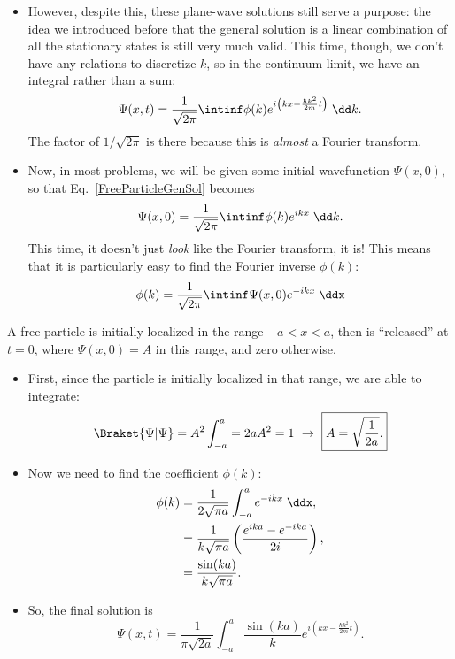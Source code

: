 \begin{itemize}
    \item However, despite this, these plane-wave solutions still serve a purpose: the idea we introduced before that the general solution is a linear combination of all the stationary states is still very much valid. This time, though, we don't have any relations to discretize $k$, so in the continuum limit, we have an integral rather than a sum:
        \begin{equation}
            \Psi(x,t) = \frac{1}{\sqrt{2\pi}} \intinf \phi(k) e^{i\left(kx - \frac{\hbar k^2}{2m}t \right)}\;\dd k.\label{FreeParticleGenSol}
        \end{equation}
        The factor of $1/\sqrt{2\pi}$ is there because this is \textit{almost} a Fourier transform.
    \item Now, in most problems, we will be given some initial wavefunction $\Psi(x,0)$, so that Eq.~\eqref{FreeParticleGenSol} becomes
        \begin{equation}
            \Psi(x,0) = \frac{1}{\sqrt{2\pi}} \intinf \phi(k) e^{ikx}\;\dd k.
        \end{equation}
        This time, it doesn't just \textit{look} like the Fourier transform, it is! This means that it is particularly easy to find the Fourier inverse $\phi(k)$:
        \begin{equation}
            \phi(k) = \frac{1}{\sqrt{2\pi}} \intinf \Psi(x,0) e^{-ikx} \;\ddx
        \end{equation}
\end{itemize}


\begin{example}
    A free particle is initially localized in the range $-a < x < a$, then is ``released'' at $t=0$, where $\Psi(x,0) = A$ in this range, and zero otherwise.

    \begin{itemize}
        \item First, since the particle is initially localized in that range, we are able to integrate:
            \begin{equation*}
                \Braket{\Psi | \Psi} = A^2 \int_{-a}^a = 2aA^2 = 1 \ \rightarrow \ \boxed{A = \sqrt{\frac{1}{2a}}.}
            \end{equation*}
        \item Now we need to find the coefficient $\phi(k)$:
            \begin{align*}
                \phi(k) &= \frac{1}{2\sqrt{\pi a}} \int_{-a}^a e^{-ikx} \;\ddx, \\
                &= \frac{1}{k\sqrt{\pi a}} \left( \frac{e^{ika} - e^{-ika}}{2i} \right), \\
                &= \frac{\sin(ka)}{k\sqrt{\pi a}}.
            \end{align*}
        \item So, the final solution is
            \begin{equation*}
                \boxed{\Psi(x,t) = \frac{1}{\pi \sqrt{2a}} \int_{-a}^a \frac{\sin(ka)}{k} e^{i\left( kx - \frac{\hbar k^2}{2m}t \right)} .}
            \end{equation*}
    \end{itemize}
\end{example}


